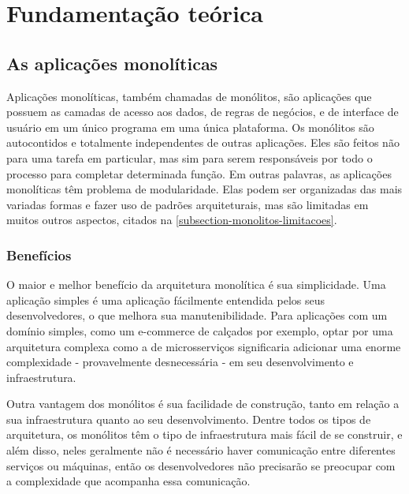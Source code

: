 \chapter{Fundamentação teórica}\label{chapter-fundamentacao}


\section{As aplicações monolíticas}

Aplicações monolíticas, também chamadas de monólitos, são aplicações que possuem as camadas de acesso aos dados, de regras de negócios, e de interface de usuário em um único programa em uma única plataforma. Os monólitos são autocontidos e totalmente independentes de outras aplicações. Eles são feitos não para uma tarefa em particular, mas sim para serem responsáveis por todo o processo para completar determinada função. Em outras palavras, as aplicações monolíticas têm problema de modularidade. Elas podem ser organizadas das mais variadas formas e fazer uso de padrões arquiteturais, mas são limitadas em muitos outros aspectos, citados na \autoref{subsection-monolitos-limitacoes}.

\subsection{Benefícios}

O maior e melhor benefício da arquitetura monolítica é sua simplicidade. Uma aplicação simples é uma aplicação fácilmente entendida pelos seus desenvolvedores, o que melhora sua manutenibilidade. Para aplicações com um domínio simples, como um e-commerce de calçados por exemplo, optar por uma arquitetura complexa como a de microsserviços significaria adicionar uma enorme complexidade - provavelmente desnecessária - em seu desenvolvimento e infraestrutura.

Outra vantagem dos monólitos é sua facilidade de construção, tanto em relação a sua infraestrutura quanto ao seu desenvolvimento. Dentre todos os tipos de arquitetura, os monólitos têm o tipo de infraestrutura mais fácil de se construir, e além disso, neles geralmente não é necessário haver comunicação entre diferentes serviços ou máquinas, então os desenvolvedores não precisarão se preocupar com a complexidade que acompanha essa comunicação.


